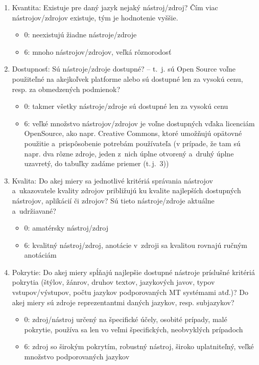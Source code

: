 \begin{multicols}{2}
\begin{enumerate}
\item Kvantita: Existuje pre daný jazyk nejaký nástroj/zdroj? Čím viac nástrojov/zdrojov existuje, tým je hodnotenie vyššie.
\begin{itemize}
\item 0: neexistujú žiadne nástroje/zdroje
\item 6: mnoho nástrojov/zdrojov, veľká rôznorodosť
\end{itemize}
\item Dostupnosť: Sú nástroje/zdroje dostupné? -- t.~j. sú Open Source voľne použiteľné na akejkoľvek platforme alebo sú dostupné len za vysokú cenu, resp. za obmedzených podmienok?
\begin{itemize}
\item 0: takmer všetky nástroje/zdroje sú dostupné len za vysokú cenu
\item 6: veľké množstvo nástrojov/zdro\-jov je voľne dostupných vďaka licenciám OpenSource, ako napr. Creative Commons, ktoré umožňujú opätovné použitie a~prispôsobenie potrebám používateľa (v prípade, že tam sú napr. dva rôzne zdroje, jeden z~nich úplne otvorený a~druhý úplne uzavretý, do tabuľky zadáme priemer (t.\,j.~3))
\end{itemize}
\item Kvalita: Do akej miery sa jednotlivé kritériá správania nástrojov a~ukazovatele kvality zdrojov približujú ku kvalite najlepších dostupných nástrojov, aplikácií či zdrojov? Sú tieto nástroje/zdroje aktuálne a~udržiavané?
\begin{itemize}
\item 0: amatérsky nástroj/zdroj
\item 6: kvalitný nástroj/zdroj, anotácie v~zdroji sa kvalitou rovnajú ručným anotáciám
\end{itemize}
\item Pokrytie: Do akej miery spĺňajú najlepšie dostupné nástroje príslušné kritériá pokrytia (štýlov, žánrov, druhov textov, jazykových javov, typov vstupov/výstupov, počtu jazykov podporovaných MT systémami atď.)? Do akej miery sú zdroje reprezentantmi daných jazykov, resp. subjazykov?
\begin{itemize}
\item 0: zdroj/nástroj určený na špecifické účely, osobité prípady, malé pokrytie, používa sa len vo veľmi špecifických, neobvyklých prípadoch
\item 6: zdroj so širokým pokrytím, robustný nástroj, široko uplatniteľný, veľké množstvo podporovaných jazykov

\end{itemize}
\end{enumerate}
\end{multicols}
